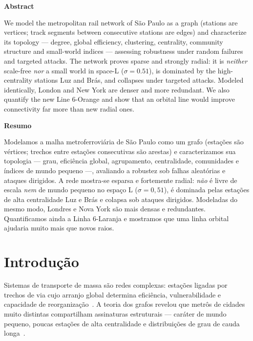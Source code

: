 \documentclass[12pt]{article}
\renewenvironment{abstract}{%
  \vspace{6pt}\begin{center}\normalfont\bfseries Abstract\end{center}\nopagebreak
  \list{}{\leftmargin=1cm\rightmargin=\leftmargin
          \listparindent=1.27cm\itemindent=\listparindent}%
  \item[]\normalfont\small}%
  {\endlist\vspace{4pt}}
\renewenvironment{resumo}{%
  \vspace{6pt}\begin{center}\normalfont\bfseries Resumo\end{center}\nopagebreak
  \list{}{\leftmargin=1cm\rightmargin=\leftmargin
          \listparindent=1.27cm\itemindent=\listparindent}%
  \item[]\normalfont\small}%
  {\endlist\vspace{4pt}}
\begin{document}
\begin{abstract}
  We model the metropolitan rail network of São Paulo as a graph (stations are
  vertices; track segments between consecutive stations are edges) and
  characterize its topology --- degree, global efficiency, clustering,
  centrality, community structure and small-world indices --- assessing
  robustness under random failures and targeted attacks. The network proves
  sparse and strongly radial: it is \emph{neither} scale-free \emph{nor} a small
  world in space-L ($\sigma=0.51$), is dominated by the high-centrality stations
  Luz and Brás, and
  collapses under targeted attacks. Modeled identically, London and New York are
  denser and more redundant. We also quantify the new Line 6-Orange and show that
  an orbital line would improve connectivity far more than new radial ones.
\end{abstract}

\begin{resumo}
  Modelamos a malha metroferroviária de São Paulo como um grafo (estações são
  vértices; trechos entre estações consecutivas são arestas) e caracterizamos sua
  topologia --- grau, eficiência global, agrupamento, centralidade, comunidades e
  índices de mundo pequeno ---, avaliando a robustez sob falhas aleatórias e
  ataques dirigidos. A rede mostra-se esparsa e fortemente radial: \emph{não} é
  livre de escala \emph{nem} de mundo pequeno no espaço L ($\sigma=0{,}51$), é
  dominada pelas estações de alta centralidade Luz e Brás e colapsa sob ataques
  dirigidos. Modeladas do mesmo
  modo, Londres e Nova York são mais densas e redundantes. Quantificamos ainda a
  Linha 6-Laranja e mostramos que uma linha orbital ajudaria muito mais que novos
  raios.
\end{resumo}

\section{Introdução}

Sistemas de transporte de massa são redes complexas: estações ligadas por
trechos de via cujo arranjo global determina eficiência, vulnerabilidade e
capacidade de reorganização~\cite{newman2003}. A teoria dos grafos revelou que
metrôs de cidades muito distintas compartilham assinaturas estruturais ---
caráter de mundo pequeno, poucas estações de alta centralidade e distribuições
de grau de cauda longa~\cite{latora2002,sen2003,derrible2010}.
\end{document}
